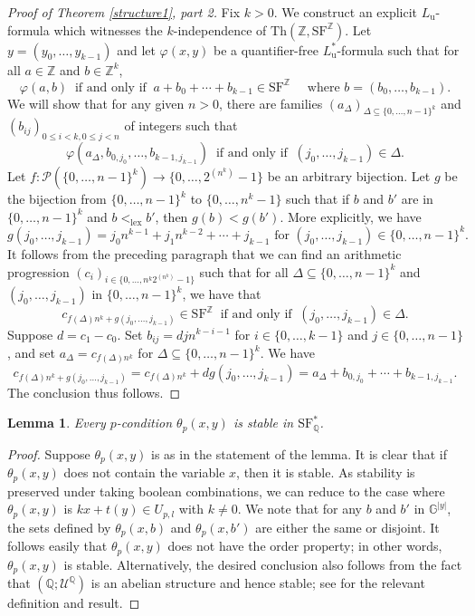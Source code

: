 \documentclass[letterpaper]{amsart}
\newcommand{\qq}{\mathbb{Q}}
\newcommand{\zz}{\mathbb{Z}}
\renewcommand{\gg}{\mathbb{G}}
\newcommand{\sU}{\mathscr{U}}
\newcommand{\sP}{\mathscr{P}}
\newcommand{\SF}{\mathrm{SF}^\zz}
\newcommand{\TSFQ}{\mathrm{SF}^*_{\qq}}
\newtheorem{lem}[thm]{Lemma}
\begin{document}
\begin{proof}[Proof of Theorem \ref{structure1}, part 2]
Fix $k>0$. We construct an explicit  $L_{\mathrm{u}}$-formula which witnesses the $k$-independence of $\text{Th}(\zz, \SF)$. Let  $y =(y_0, \ldots, y_{k-1})$ and let $\varphi(x, y)$ be a quantifier-free $L^*_{\mathrm{u}}$-formula such that for all $a \in \zz$ and $b \in \zz^k$,
$$ \varphi(a, b) \ \text{ if and only if }\ a+ b_0+\cdots+b_{k-1} \in \SF \quad\text{ where } b =(b_0, \ldots, b_{k-1}).  $$
We will show that for any given $n >0$, there are families $(a_\Delta)_{ \Delta \subseteq \{ 0, \ldots, n-1\}^k}$ and $(b_{ij})_{0\leq i < k, 0 \leq  j < n }$ of integers such that
$$ \varphi(a_\Delta, b_{0,j_0}, \ldots, b_{k-1,j_{k-1}} ) \ \text{ if and only if }\ (j_0, \ldots, j_{k-1}) \in \Delta. $$
Let $f: \sP(\{0,\ldots, n-1\}^k) \to \{0,\ldots, 2^{(n^k)}-1\}$ be an arbitrary bijection. Let $g$ be the bijection from $\{ 0, \ldots, n-1\}^k$ to $\{ 0, \ldots, n^k-1\}$ such that if $b$ and $b'$ are in $\{ 0, \ldots, n-1\}^k $ and $b<_{\text{lex}}b'$, then $g(b)<g(b')$. More explicitly, we have
$$g(j_0, \ldots, j_{k-1}) =j_0n^{k-1} + j_1n^{k-2} + \cdots + j_{k-1} \text{ for } (j_0, \ldots, j_{k-1}) \in \{ 0, \ldots, n-1\}^k. $$
It follows from the preceding paragraph that we can find an arithmetic progression $(c_i)_{ i \in  \{0, \ldots, n^k 2^{(n^k)} -1 \} }$ such that for all $\Delta \subseteq \{0, \ldots, n-1\}^k$ and $(j_0, \ldots, j_{k-1})$ in $\{ 0, \ldots, n-1\}^k$, we have that
$$  c_{f(\Delta)n^k+ g(j_0, \ldots, j_{k-1})} \in \SF\  \text{ if and only if } \ (j_0, \ldots, j_{k-1}) \in \Delta. $$
Suppose $d = c_1-c_0$.  Set $b_{ij} =  djn^{k-i-1} $ for $i \in \{0, \ldots, k-1\}$ and $j \in \{0, \ldots, n-1\}$, and set $a_{\Delta} = c_{f(\Delta)n^k}$ for $\Delta \subseteq \{ 0, \ldots, n-1\}^k$. We have
$$ c_{f(\Delta)n^k+ g(j_0, \ldots, j_{k-1})} = c_{f(\Delta)n^k} + d g(j_0, \ldots, j_{k-1}) = a_\Delta + b_{0,j_0}+ \cdots+ b_{k-1,j_{k-1}}.   $$
The conclusion thus follows.
\end{proof}

\begin{lem} \label{localstability}
Every $p$-condition $\theta_p(x,y)$ is stable in  $\TSFQ$.
\end{lem}
\begin{proof}
Suppose $\theta_p(x,y)$ is as in the statement of the lemma. It is clear that if $\theta_p(x,y)$ does not contain the variable $x$, then it is stable. As stability is preserved  under taking boolean combinations, we can reduce to the case where $\theta_p(x,y)$ is $kx+t(y) \in U_{p,l}$ with $k\neq 0$. We note that for any $b$ and $b'$ in $\gg^{|y|}$, the sets defined by $\theta_p(x, b)$  and $\theta_p(x, b')$ are either the same or disjoint. It follows easily that $\theta_p(x, y)$ does not have the order property; in other words, $\theta_p(x,y)$ is stable. Alternatively, the desired conclusion also follows from the fact that  $( \qq; \sU^\qq)$ is an abelian structure and hence stable; see \cite[p. 49]{Wagner} for the relevant definition and result.
\end{proof}
\end{document}
